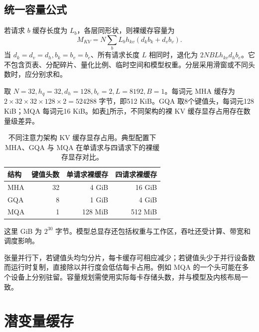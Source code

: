 \documentclass[../textbook.tex]{subfiles}
\begin{document}
\subsection{统一容量公式}
若请求 $b$ 缓存长度为 $L_b$，各层同形状，则裸缓存容量为
\begin{equation}
 M_{KV}=N\sum_bL_bh_{kv}(d_kb_k+d_vb_v).
 \label{eq:cache-memory}
\end{equation}
当 $d_k=d_v=d_h,b_k=b_v=b_e$、所有请求长度 $L$ 相同时，退化为 $2NBLh_{kv}d_hb_e$。它不包含页表、分配碎片、量化比例、临时空间和模型权重。分层采用滑窗或不同头数时，应分别求和。

取 $N=32,h_q=32,d_h=128,b_e=2,L=8192,B=1$。每词元 MHA 缓存为 $2\times32\times32\times128\times2=524288$ 字节，即512 KiB。GQA 取8个键值头，每词元128 KiB；MQA 每词元16 KiB。如表\ref{tab:cache-variants-memory}所示，不同架构的裸 KV 缓存显存占用存在数量级差异。

\begin{table}[htbp]
\centering
\caption[不同注意力架构 KV 缓存显存占用]{不同注意力架构 KV 缓存显存占用。典型配置下 MHA、GQA 与 MQA 在单请求与四请求下的裸缓存显存对比。}\label{tab:cache-variants-memory}
\begin{tabular}{lrrr}
\toprule 结构 & 键值头数 & 单请求裸缓存 & 四请求裸缓存\\\midrule
MHA & 32 & 4 GiB & 16 GiB\\
GQA & 8 & 1 GiB & 4 GiB\\
MQA & 1 & 128 MiB & 512 MiB\\
\bottomrule
\end{tabular}
\end{table}
这里 GiB 为 $2^{30}$ 字节。模型总显存还包括权重与工作区，吞吐还受计算、带宽和调度影响。

张量并行下，若键值头均匀分片，每卡缓存可相应减少；若键值头少于并行设备数而运行时复制，直接除以并行度会低估每卡占用。例如 MQA 的一个头可能在多个设备上分别驻留。容量规划需使用实际每卡存储头数，并与模型及内核布局一致。

\section{潜变量缓存}
\optional
\end{document}
